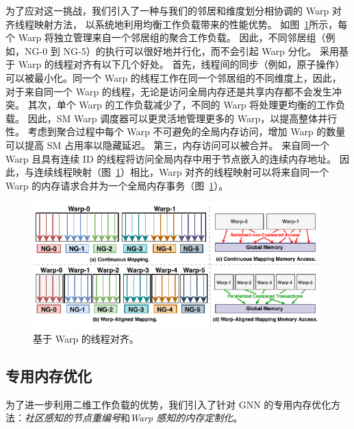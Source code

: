为了应对这一挑战，我们引入了一种与我们的邻居和维度划分相协调的 Warp 对齐线程映射方法，
以系统地利用均衡工作负载带来的性能优势。
如图~\ref{fig: warp-based Thread Alignment}所示，每个 Warp 将独立管理来自一个邻居组的聚合工作负载。
因此，不同邻居组（例如，NG-0 到 NG-5）的执行可以很好地并行化，而不会引起 Warp 分化。
采用基于 Warp 的线程对齐有以下几个好处。
首先，线程间的同步（例如，原子操作）可以被最小化。同一个 Warp 的线程工作在同一个邻居组的不同维度上，因此，对于来自同一个 Warp 的线程，无论是访问全局内存还是共享内存都不会发生冲突。
其次，单个 Warp 的工作负载减少了，不同的 Warp 将处理更均衡的工作负载。
因此，SM Warp 调度器可以更灵活地管理更多的 Warp，以提高整体并行性。
考虑到聚合过程中每个 Warp 不可避免的全局内存访问，增加 Warp 的数量可以提高 SM 占用率以隐藏延迟。
第三，内存访问可以被合并。
来自同一个 Warp 且具有连续 ID 的线程将访问全局内存中用于节点嵌入的连续内存地址。
因此，与连续线程映射（图~\ref{fig: warp-based Thread Alignment}）相比，Warp 对齐的线程映射可以将来自同一个 Warp 的内存请求合并为一个全局内存事务（图~\ref{fig: warp-based Thread Alignment}）。
\begin{figure} [t] \small
    \centering
    \includegraphics[width=\columnwidth]{images/warp-alignment.pdf}
    \vspace{-15pt}
    \caption{基于 Warp 的线程对齐。}
    \vspace{-15pt}
    \label{fig: warp-based Thread Alignment}
\end{figure}
\subsection{专用内存优化}
\label{sect: Specialized Memory Optimization}
为了进一步利用二维工作负载的优势，我们引入了针对 GNN 的专用内存优化方法：\textit{社区感知的节点重编号}和\textit{Warp 感知的内存定制化}。

